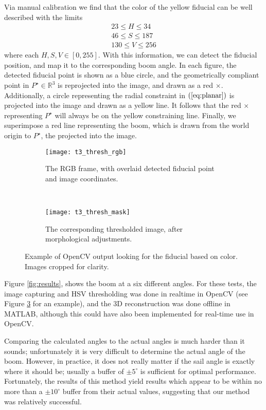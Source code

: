 \documentclass[letterpaper, 10 pt, conference]{ieeeconf}  %
\newcommand{\eq}[1]{$\left(\ref{eq:#1}\right)$}
\newcommand{\real}[1]{\mathbb{R}^{#1}}
\begin{document}
Via manual calibration we find that the color of the yellow fiducial can be well described with the limits
\begin{gather*}
23 \leq H \leq 34\\
46 \leq S \leq 187\\
130 \leq V \leq 256
\end{gather*} 
where each $H,S,V \in [0,255]$.
With this information, we can detect the fiducial position, and map it to the corresponding boom angle. In each figure, the detected fiducial point is shown as a blue circle, and the geometrically compliant point in $P^\star \in \real{3}$ is reprojected into the image, and drawn as a red $\times$. Additionally, a circle representing the radial constraint in \eq{planar} is projected into the image and drawn as a yellow line. It follows that the red $\times$ representing $P^\star$ will always be on the yellow constraining line. Finally, we superimpose a red line representing the boom, which is drawn from the world origin to $P^\star$, the projected into the image. 

\begin{figure}[htbp]

 \centering
         \begin{subfigure}[b]{0.23\textwidth}
                \texttt{[image: t3\_thresh\_rgb]}
                \caption{The RGB frame, with overlaid detected fiducial point and image coordinates.}
                \label{fig:t3_thresh_rgb}
        \end{subfigure}
        ~
        \begin{subfigure}[b]{0.23\textwidth}
                \texttt{[image: t3\_thresh\_mask]}
                \caption{The corresponding thresholded image, after morphological adjustments.}
                \label{fig:t3_thresh_mask}
        \end{subfigure}
  \caption{Example of OpenCV output looking for the fiducial based on color. Images cropped for clarity.}
   \label{fig:t3_thresh}
\end{figure}

Figure \ref{fig:results}, shows the boom at a six different angles. For these tests, the image capturing and HSV thresholding was done in realtime in OpenCV (see Figure \ref{fig:t3_thresh} for an example), and the 3D reconstruction  was done offline in MATLAB, although this could have also been implemented for real-time use in OpenCV.

Comparing the calculated angles to the actual angles is much harder than it sounds; unfortunately it is very difficult to determine the actual angle of the boom. However, in practice, it does not really matter if the sail angle is exactly where it should be; usually a buffer of $\pm 5^\circ$ is sufficient for optimal performance. Fortunately, the results of this method yield results which appear to be within no more than a $\pm 10 ^\circ$  buffer from their actual values, suggesting that our method was relatively successful.
\end{document}
